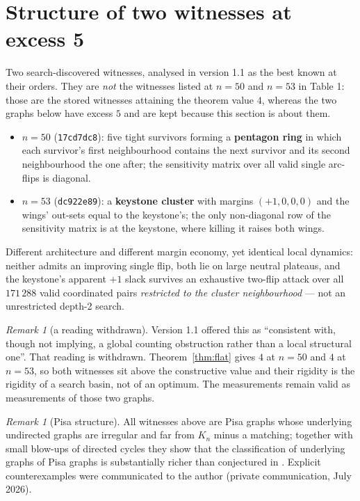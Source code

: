 \documentclass[11pt]{amsart}
\theoremstyle{remark}
\newtheorem{remark}[theorem]{Remark}
\begin{document}
\section{Structure of two witnesses at excess 5}\label{sec:structure}

Two search-discovered witnesses, analysed in version 1.1 as the best known at
their orders. They are \emph{not} the witnesses listed at $n = 50$ and
$n = 53$ in Table 1: those are the stored witnesses attaining the theorem
value $4$, whereas the two graphs below have excess $5$ and are kept because
this section is about them.

\begin{itemize}
\item $n = 50$ (\texttt{17cd7dc8}): five tight survivors forming a
  \textbf{pentagon ring} in which each survivor's first neighbourhood contains
  the next survivor and its second neighbourhood the one after; the
  sensitivity matrix over all valid single arc-flips is diagonal.
\item $n = 53$ (\texttt{dc922e89}): a \textbf{keystone cluster} with margins
  $(+1, 0, 0, 0)$ and the wings' out-sets equal to the keystone's; the only
  non-diagonal row of the sensitivity matrix is at the keystone, where killing
  it raises both wings.
\end{itemize}

Different architecture and different margin economy, yet identical local
dynamics: neither admits an improving single flip, both lie on large neutral
plateaus, and the keystone's apparent $+1$ slack survives an exhaustive
two-flip attack over all $171\,288$ valid coordinated pairs
\emph{restricted to the cluster neighbourhood} --- not an unrestricted
depth-2 search.

\begin{remark}[a reading withdrawn]
Version 1.1 offered this as ``consistent with, though not implying, a global
counting obstruction rather than a local structural one''. That reading is
withdrawn. Theorem~\ref{thm:flat} gives $4$ at $n = 50$ and $4$ at $n = 53$,
so both witnesses sit above the constructive value and their rigidity is the
rigidity of a search basin, not of an optimum. The measurements remain valid
as measurements of those two graphs.
\end{remark}

\begin{remark}[Pisa structure]
All witnesses above are Pisa graphs whose underlying undirected graphs are
irregular and far from $K_n$ minus a matching; together with small blow-ups of
directed cycles they show that the classification of underlying graphs of Pisa
graphs is substantially richer than conjectured in
\cite[Conj.~5.1]{Halkiewicz2026}. Explicit counterexamples were communicated
to the author (private communication, July 2026).
\end{remark}
\end{document}
